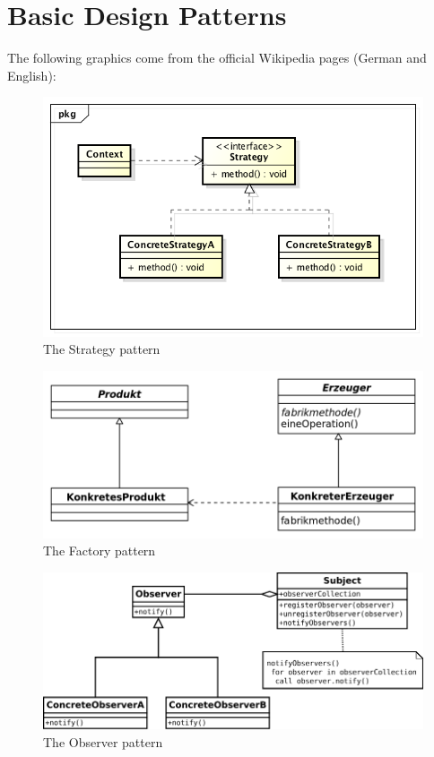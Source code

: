 \documentclass[../main/main.tex]{subfiles}
\begin{document}
\section{Basic Design Patterns}

The following graphics come from the official Wikipedia pages (German and English): 

\begin{figure}
  \includegraphics{../figures/strategy.png}  
  \caption{The Strategy pattern}
  \label{fig:strategy}
\end{figure}

\begin{figure}
  \includegraphics{../figures/factory.png}  
  \caption{The Factory pattern}
  \label{fig:factory}
\end{figure}

\begin{figure}
  \includegraphics{../figures/observer.png}  
  \caption{The Observer pattern}
  \label{fig:observer}
\end{figure}
\end{document}
